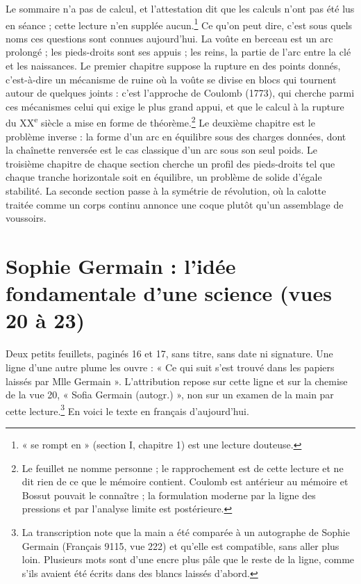 \documentclass[11pt,a4paper]{article}
\begin{document}
Le sommaire n'a pas de calcul, et l'attestation dit que les calculs n'ont
pas été lus en séance ; cette lecture n'en supplée aucun.\footnote{« se rompt
en » (section I, chapitre 1) est une lecture douteuse.} Ce qu'on peut dire,
c'est sous quels noms ces questions sont connues aujourd'hui. La voûte en
berceau est un arc prolongé ; les pieds-droits sont ses appuis ; les reins,
la partie de l'arc entre la clé et les naissances. Le premier chapitre suppose
la rupture en des points donnés, c'est-à-dire un mécanisme de ruine où la
voûte se divise en blocs qui tournent autour de quelques joints : c'est
l'approche de Coulomb (1773), qui cherche parmi ces mécanismes celui qui
exige le plus grand appui, et que le calcul à la rupture du
XX\textsuperscript{e} siècle a mise en forme de
théorème.\footnote{Le feuillet ne nomme personne ; le rapprochement est de
cette lecture et ne dit rien de ce que le mémoire contient. Coulomb est
antérieur au mémoire et Bossut pouvait le connaître ; la formulation moderne
par la ligne des pressions et par l'analyse limite est postérieure.} Le
deuxième chapitre est le problème inverse : la forme d'un arc en équilibre
sous des charges données, dont la chaînette renversée est le cas classique
d'un arc sous son seul poids. Le troisième chapitre de chaque section cherche
un profil des pieds-droits tel que chaque tranche horizontale soit en
équilibre, un problème de solide d'égale stabilité. La seconde section passe
à la symétrie de révolution, où la calotte traitée comme un corps continu
annonce une coque plutôt qu'un assemblage de voussoirs.

\section*{Sophie Germain : l'idée fondamentale d'une science (vues 20 à 23)}

Deux petits feuillets, paginés 16 et 17, sans titre, sans date ni signature.
Une ligne d'une autre plume les ouvre : « Ce qui suit s'est trouvé dans les
papiers laissés par Mlle Germain ». L'attribution repose sur cette ligne et
sur la chemise de la vue 20, « Sofia Germain (autogr.) », non sur un examen
de la main par cette lecture.\footnote{La transcription note que la main a
été comparée à un autographe de Sophie Germain (Français 9115, vue 222) et
qu'elle est compatible, sans aller plus loin. Plusieurs mots sont d'une encre
plus pâle que le reste de la ligne, comme s'ils avaient été écrits dans des
blancs laissés d'abord.} En voici le texte en français d'aujourd'hui.
\end{document}
